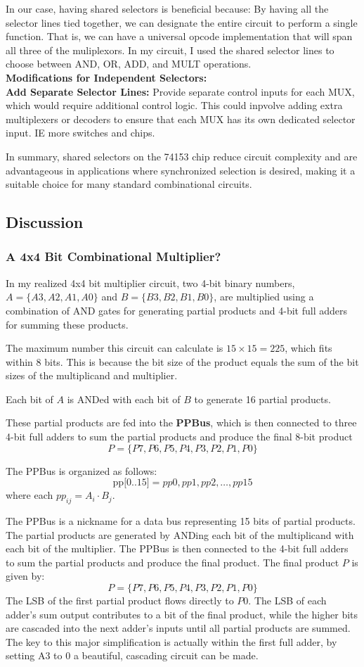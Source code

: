 \documentclass[12pt]{article}
\begin{document}
In our case, having shared selectors is beneficial because:
By having all the selector lines tied together, we can designate the entire circuit to perform a single function. That is, we can have a universal opcode implementation that will span all three of the muliplexors. In my circuit, I used the shared selector lines to choose between AND, OR, ADD, and MULT operations.\\
\textbf{Modifications for Independent Selectors:}\\
\textbf{Add Separate Selector Lines:} Provide separate control inputs for each MUX, which would require additional control logic. This could inpvolve adding extra multiplexers or decoders to ensure that each MUX has its own dedicated selector input. IE more switches and chips.

In summary, shared selectors on the 74153 chip reduce circuit complexity and are advantageous in applications where synchronized selection is desired, making it a suitable choice for many standard combinational circuits.
\subsection*{Discussion}
\subsubsection*{A 4x4 Bit Combinational Multiplier?}
In my realized 4x4 bit multiplier circuit, two 4-bit binary numbers, \( A = \{A3, A2, A1, A0\} \) and \( B = \{B3, B2, B1, B0\} \), are multiplied using a combination of AND gates for generating partial products and 4-bit full adders for summing these products.

The maximum number this circuit can calculate is \( 15 \times 15 = 225 \), which fits within 8 bits. This is because the bit size of the product equals the sum of the bit sizes of the multiplicand and multiplier.

Each bit of \( A \) is ANDed with each bit of \( B \) to generate 16 partial products.

These partial products are fed into the \textbf{PPBus}, which is then connected to three 4-bit full adders to sum the partial products and produce the final 8-bit product
\[
	P = \{P7, P6, P5, P4, P3, P2, P1, P0\}
\]

The PPBus is organized as follows:
\[
	\text{pp[0..15]} =  pp0, pp1, pp2, \dots, pp15
\]
where each \( pp_{ij} = A_i \cdot B_j \).

The PPBus is a nickname for a data bus representing 15 bits of partial products. The partial products are generated by ANDing each bit of the multiplicand with each bit of the multiplier. The PPBus is then connected to the 4-bit full adders to sum the partial products and produce the final product.
The final product \( P \) is given by:
\[
	P = \{ P7, P6, P5, P4, P3, P2, P1, P0 \}
\]
The LSB of the first partial product flows directly to \( P0 \). The LSB of each adder's sum output contributes to a bit of the final product, while the higher bits are cascaded into the next adder’s inputs until all partial products are summed. The key to this major simplification is actually within the first full adder, by setting A3 to \(0\) a beautiful, cascading circuit can be made.
\end{document}
